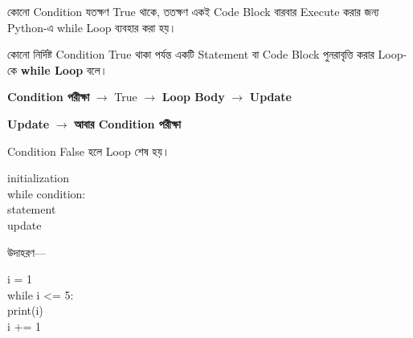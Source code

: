 
কোনো Condition যতক্ষণ
\textenglish{\ttfamily True}
থাকে, ততক্ষণ একই Code Block বারবার Execute করার জন্য Python-এ
\textenglish{\ttfamily while}
Loop ব্যবহার করা হয়।



\begin{definitionbox}

কোনো নির্দিষ্ট Condition
\textenglish{\ttfamily True}
থাকা পর্যন্ত একটি Statement বা Code Block পুনরাবৃত্তি করার Loop-কে
\textbf{\textenglish{\ttfamily while} Loop} বলে।

\end{definitionbox}

\begin{center}

\textbf{Condition পরীক্ষা}
\(\longrightarrow\)
\textenglish{\ttfamily True}
\(\longrightarrow\)
\textbf{Loop Body}
\(\longrightarrow\)
\textbf{Update}

\medskip

\textbf{Update}
\(\longrightarrow\)
\textbf{আবার Condition পরীক্ষা}

\end{center}

Condition
\textenglish{\ttfamily False}
হলে Loop শেষ হয়।



\begin{codebox}
\begin{english}
\ttfamily
initialization\\[0.5mm]
while condition:\\
\hspace*{4mm}statement\\
\hspace*{4mm}update
\end{english}
\end{codebox}

উদাহরণ—

\begin{codebox}
\begin{english}
\ttfamily
i = 1\\[0.5mm]
while i <= 5:\\
\hspace*{4mm}print(i)\\
\hspace*{4mm}i += 1
\end{english}
\end{codebox}

